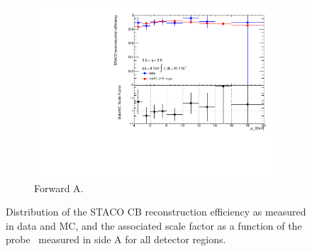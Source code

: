 \begin{figure}[htbp]
    \begin{subfigure}[b]{0.45\textwidth}
      \includegraphics[width=\textwidth]{PartCalibration2012/Plots/SFPlots/Forward_A_reco.pdf}
      \caption{Forward A.}\label{fig:CalibrationRecoSFForwardA}
    \end{subfigure}
    \caption{Distribution of the STACO CB reconstruction efficiency as measured in data and MC, and the associated scale factor as a function of the probe \pt\ measured in side A for all detector regions.}\label{fig:RecoEffSideA}
\end{figure}

